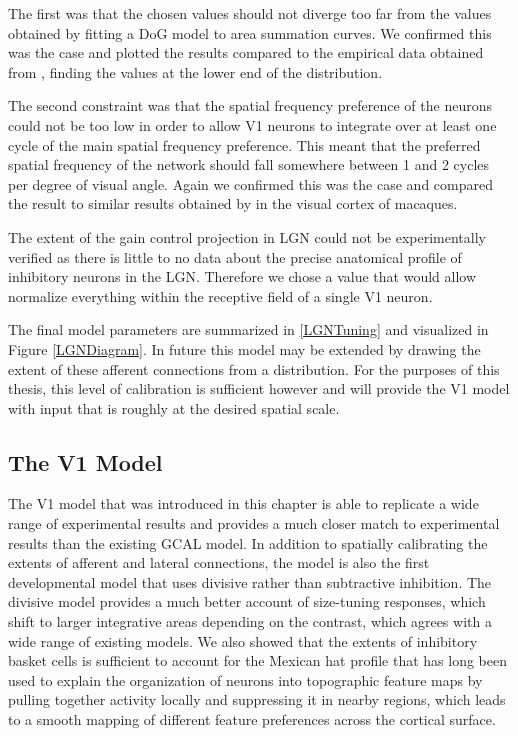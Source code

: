 The first was that the chosen values should not diverge too far from
the values obtained by fitting a DoG model to area summation
curves. We confirmed this was the case and plotted the results
compared to the empirical data obtained from \cite{Sceniak2006},
finding the values at the lower end of the distribution.

The second constraint was that the spatial frequency preference of the
neurons could not be too low in order to allow V1 neurons to integrate
over at least one cycle of the main spatial frequency preference. This
meant that the preferred spatial frequency of the network should fall
somewhere between 1 and 2 cycles per degree of visual angle. Again we
confirmed this was the case and compared the result to similar results
obtained by \cite{Levitt2001} in the visual cortex of macaques.

The extent of the gain control projection in LGN could not be
experimentally verified as there is little to no data about the
precise anatomical profile of inhibitory neurons in the LGN. Therefore
we chose a value that would allow normalize everything within the
receptive field of a single V1 neuron.

The final model parameters are summarized in \ref{LGNTuning} and
visualized in Figure \ref{LGNDiagram}. In future this model may be
extended by drawing the extent of these afferent connections from a
distribution. For the purposes of this thesis, this level of
calibration is sufficient however and will provide the V1 model with
input that is roughly at the desired spatial scale.

\subsection{The V1 Model}

The V1 model that was introduced in this chapter is able to replicate
a wide range of experimental results and provides a much closer match
to experimental results than the existing GCAL model. In addition to
spatially calibrating the extents of afferent and lateral connections,
the model is also the first developmental model that uses divisive
rather than subtractive inhibition. The divisive model provides a much
better account of size-tuning responses, which shift to larger
integrative areas depending on the contrast, which agrees with a wide
range of existing models. We also showed that the extents of
inhibitory basket cells is sufficient to account for the Mexican hat
profile that has long been used to explain the organization of neurons
into topographic feature maps by pulling together activity locally and
suppressing it in nearby regions, which leads to a smooth mapping of
different feature preferences across the cortical surface.

